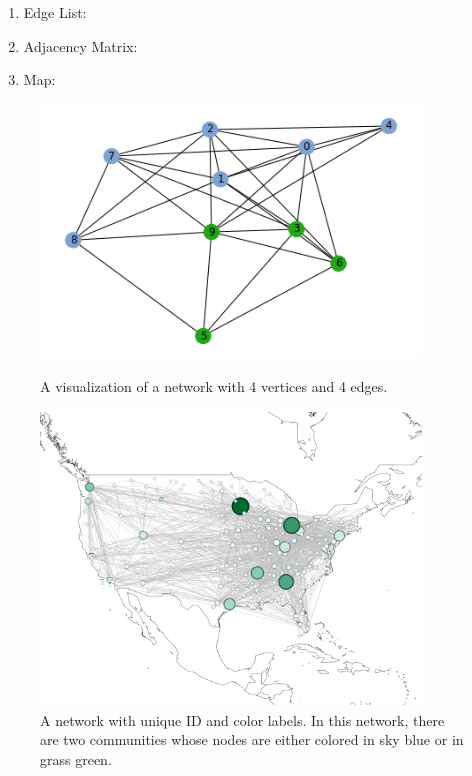 \documentclass[12pt]{article}
\begin{document}
\begin{enumerate}[label=(\roman*)]
\item Edge List:
\item Adjacency Matrix:
\item Map: 
\end{enumerate}


\bigskip
\begin{figure}
    \centering
    \begin{minipage}{0.45\textwidth}
        \centering
        \includegraphics[width=0.9\textwidth]{fig_1.png} %
        \caption{\label{fig:fig_1} A visualization of a network with 4 vertices and 4 edges.}
    \end{minipage}\hfill
    \begin{minipage}{0.45\textwidth}
        \centering
        \includegraphics[width=0.9\textwidth]{fig_2.png} %
        \caption{\label{fig:fig_2}A network with unique ID and color labels. In this network, there are two communities whose nodes are either colored in sky blue or in grass green.}
    \end{minipage}
\end{figure}
\end{document}
